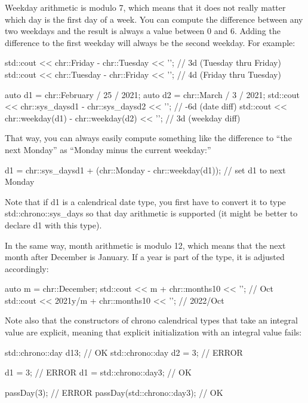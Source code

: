 Weekday arithmetic is modulo 7, which means that it does not really matter which day is the first day of a week. You can compute the difference between any two weekdays and the result is always a value between 0 and 6. Adding the difference to the first weekday will always be the second weekday. For example:

\begin{cpp}
std::cout << chr::Friday - chr::Tuesday << '\n'; // 3d (Tuesday thru Friday)
std::cout << chr::Tuesday - chr::Friday << '\n'; // 4d (Friday thru Tuesday)

auto d1 = chr::February / 25 / 2021;
auto d2 = chr::March / 3 / 2021;
std::cout << chr::sys_days{d1} - chr::sys_days{d2} << '\n'; // -6d (date diff)
std::cout << chr::weekday(d1) - chr::weekday(d2) << '\n'; // 3d (weekday diff)
\end{cpp}

That way, you can always easily compute something like the difference to “the next Monday” as “Monday minus the current weekday:”

\begin{cpp}
d1 = chr::sys_days{d1} + (chr::Monday - chr::weekday(d1)); // set d1 to next Monday
\end{cpp}

Note that if d1 is a calendrical date type, you first have to convert it to type std::chrono::sys\_days so that day arithmetic is supported (it might be better to declare d1 with this type).

In the same way, month arithmetic is modulo 12, which means that the next month after December is January. If a year is part of the type, it is adjusted accordingly:

\begin{cpp}
auto m = chr::December;
std::cout << m + chr::months{10} << '\n'; // Oct
std::cout << 2021y/m + chr::months{10} << '\n'; // 2022/Oct
\end{cpp}

Note also that the constructors of chrono calendrical types that take an integral value are explicit, meaning that explicit initialization with an integral value fails:

\begin{cpp}
std::chrono::day d1{3}; // OK
std::chrono::day d2 = 3; // ERROR

d1 = 3; // ERROR
d1 = std::chrono::day{3}; // OK

passDay(3); // ERROR
passDay(std::chrono::day{3}); // OK
\end{cpp}

